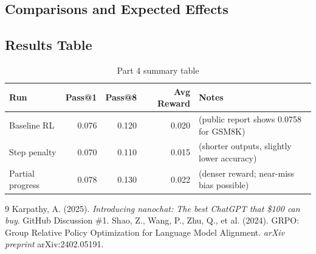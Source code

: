 \documentclass[11pt]{article}
\begin{document}
\subsection*{Comparisons and Expected Effects}

\subsection*{Results Table}
\begin{table}[h]
\centering
\begin{tabular}{l r r r l}
\toprule
\textbf{Run} & \textbf{Pass@1} & \textbf{Pass@8} & \textbf{Avg Reward} & \textbf{Notes} \\
\midrule
Baseline RL & 0.076 & 0.120 & 0.020 & (public report shows 0.0758 for GSM8K) \cite{karpathy_discussion} \\
Step penalty & 0.070 & 0.110 & 0.015 & (shorter outputs, slightly lower accuracy) \\
Partial progress & 0.078 & 0.130 & 0.022 & (denser reward; near-miss bias possible) \\
\bottomrule
\end{tabular}
\caption{Part 4 summary table}
\end{table}

\begin{thebibliography}{9}
Karpathy, A. (2025). \textit{Introducing nanochat: The best ChatGPT that \$100 can buy}. GitHub Discussion \#1.
Shao, Z., Wang, P., Zhu, Q., et al. (2024). GRPO: Group Relative Policy Optimization for Language Model Alignment. \textit{arXiv preprint} arXiv:2402.05191.
\end{thebibliography}
\end{document}
